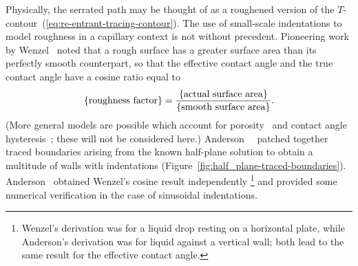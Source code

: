 Physically, the serrated path
may be thought of as a roughened version
of the $T$-contour~(\ref{eq:re-entrant-tracing-contour}).
The use of small-scale indentations
to model roughness in a capillary context
is not without precedent.
Pioneering work
by Wenzel~\cite{wenzel-1936-resistance-solid-surfaces-wetting}
noted that a rough surface has a greater surface area
than its perfectly smooth counterpart,
so that the effective contact angle and the true contact angle
have a cosine ratio equal to
\begin{equation}
  \left\{\textnormal{roughness factor}\right\} =
    \frac{\left\{\textnormal{actual surface area}\right\}}{\left\{\textnormal{smooth surface area}\right\}}.
  \label{eq:wenzel-roughness}
\end{equation}
(More general models are possible which account for
porosity~\cite{cassie-1944-wettability-porous-surfaces}
and contact angle hysteresis~\cite{
  cox-1983-spreading-liquid-rough-surface,
  johnson-1964-contact-angle-hysteresis
};
these will not be considered here.)
Anderson~\etal~\cite{anderson-2006-exact-solutions-laplace-young}
patched together traced boundaries
arising from the known half-plane solution
to obtain a multitude of walls with indentations
(Figure~\ref{fig:half_plane-traced-boundaries}).
Anderson~\cite[Section~6.4]{anderson-2002-thesis-boundary-tracing-pdes}
obtained Wenzel's cosine result independently%
\footnote{
  Wenzel's derivation was for a liquid drop resting on a horizontal plate,
  while Anderson's derivation was for liquid against a vertical wall;
  both lead to the same result for the effective contact angle.
}
and provided some numerical verification
in the case of sinusoidal indentations.

\begin{figure}
\end{figure}

